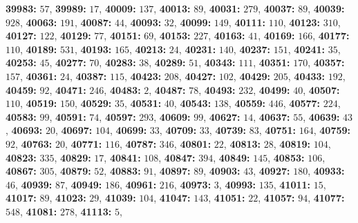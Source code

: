 \textsf{\bfseries 39983:} $57$, \textsf{\bfseries 39989:} $17$, \textsf{\bfseries 40009:} $137$, \textsf{\bfseries 40013:} $89$, \textsf{\bfseries 40031:} $279$, \textsf{\bfseries 40037:} $89$, \textsf{\bfseries 40039:} $928$, \textsf{\bfseries 40063:} $191$, \textsf{\bfseries 40087:} $44$, \textsf{\bfseries 40093:} $32$, \textsf{\bfseries 40099:} $149$, \textsf{\bfseries 40111:} $110$, \textsf{\bfseries 40123:} $310$, \textsf{\bfseries 40127:} $122$, \textsf{\bfseries 40129:} $77$, \textsf{\bfseries 40151:} $69$, \textsf{\bfseries 40153:} $227$, \textsf{\bfseries 40163:} $41$, \textsf{\bfseries 40169:} $166$, \textsf{\bfseries 40177:} $110$, \textsf{\bfseries 40189:} $531$, \textsf{\bfseries 40193:} $165$, \textsf{\bfseries 40213:} $24$, \textsf{\bfseries 40231:} $140$, \textsf{\bfseries 40237:} $151$, \textsf{\bfseries 40241:} $35$, \textsf{\bfseries 40253:} $45$, \textsf{\bfseries 40277:} $70$, \textsf{\bfseries 40283:} $38$, \textsf{\bfseries 40289:} $51$, \textsf{\bfseries 40343:} $111$, \textsf{\bfseries 40351:} $170$, \textsf{\bfseries 40357:} $157$, \textsf{\bfseries 40361:} $24$, \textsf{\bfseries 40387:} $115$, \textsf{\bfseries 40423:} $208$, \textsf{\bfseries 40427:} $102$, \textsf{\bfseries 40429:} $205$, \textsf{\bfseries 40433:} $192$, \textsf{\bfseries 40459:} $92$, \textsf{\bfseries 40471:} $246$, \textsf{\bfseries 40483:} $2$, \textsf{\bfseries 40487:} $78$, \textsf{\bfseries 40493:} $232$, \textsf{\bfseries 40499:} $40$, \textsf{\bfseries 40507:} $110$, \textsf{\bfseries 40519:} $150$, \textsf{\bfseries 40529:} $35$, \textsf{\bfseries 40531:} $40$, \textsf{\bfseries 40543:} $138$, \textsf{\bfseries 40559:} $446$, \textsf{\bfseries 40577:} $224$, \textsf{\bfseries 40583:} $99$, \textsf{\bfseries 40591:} $74$, \textsf{\bfseries 40597:} $293$, \textsf{\bfseries 40609:} $99$, \textsf{\bfseries 40627:} $14$, \textsf{\bfseries 40637:} $55$, \textsf{\bfseries 40639:} $43$, \textsf{\bfseries 40693:} $20$, \textsf{\bfseries 40697:} $104$, \textsf{\bfseries 40699:} $33$, \textsf{\bfseries 40709:} $33$, \textsf{\bfseries 40739:} $83$, \textsf{\bfseries 40751:} $164$, \textsf{\bfseries 40759:} $92$, \textsf{\bfseries 40763:} $20$, \textsf{\bfseries 40771:} $116$, \textsf{\bfseries 40787:} $346$, \textsf{\bfseries 40801:} $22$, \textsf{\bfseries 40813:} $28$, \textsf{\bfseries 40819:} $104$, \textsf{\bfseries 40823:} $335$, \textsf{\bfseries 40829:} $17$, \textsf{\bfseries 40841:} $108$, \textsf{\bfseries 40847:} $394$, \textsf{\bfseries 40849:} $145$, \textsf{\bfseries 40853:} $106$, \textsf{\bfseries 40867:} $305$, \textsf{\bfseries 40879:} $52$, \textsf{\bfseries 40883:} $91$, \textsf{\bfseries 40897:} $89$, \textsf{\bfseries 40903:} $43$, \textsf{\bfseries 40927:} $180$, \textsf{\bfseries 40933:} $46$, \textsf{\bfseries 40939:} $87$, \textsf{\bfseries 40949:} $186$, \textsf{\bfseries 40961:} $216$, \textsf{\bfseries 40973:} $3$, \textsf{\bfseries 40993:} $135$, \textsf{\bfseries 41011:} $15$, \textsf{\bfseries 41017:} $89$, \textsf{\bfseries 41023:} $29$, \textsf{\bfseries 41039:} $104$, \textsf{\bfseries 41047:} $143$, \textsf{\bfseries 41051:} $22$, \textsf{\bfseries 41057:} $94$, \textsf{\bfseries 41077:} $548$, \textsf{\bfseries 41081:} $278$, \textsf{\bfseries 41113:} $5$, 
